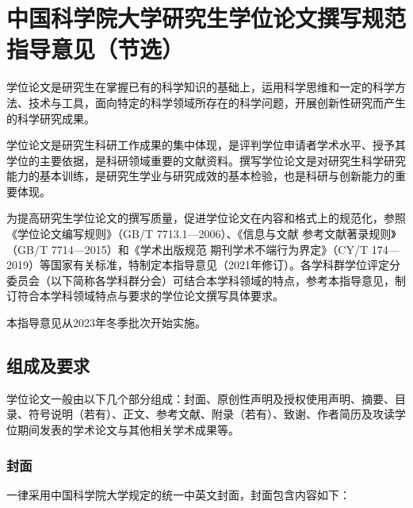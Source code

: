 
\chapter{中国科学院大学研究生学位论文撰写规范指导意见（节选）}

学位论文是研究生在掌握已有的科学知识的基础上，运用科学思维和一定的科学方法、技术与工具，面向特定的科学领域所存在的科学问题，开展创新性研究而产生的科学研究成果。

学位论文是研究生科研工作成果的集中体现，是评判学位申请者学术水平、授予其学位的主要依据，是科研领域重要的文献资料。撰写学位论文是对研究生科学研究能力的基本训练，是研究生学业与研究成效的基本检验，也是科研与创新能力的重要体现。

为提高研究生学位论文的撰写质量，促进学位论文在内容和格式上的规范化，参照《学位论文编写规则》（GB/T 7713.1—2006）、《信息与文献 参考文献著录规则》（GB/T 7714—2015）和《学术出版规范 期刊学术不端行为界定》（CY/T 174—2019）等国家有关标准，特制定本指导意见（2021年修订）。各学科群学位评定分委员会（以下简称各学科群分会）可结合本学科领域的特点，参考本指导意见，制订符合本学科领域特点与要求的学位论文撰写具体要求。

本指导意见从2023年冬季批次开始实施。

\section{组成及要求}
学位论文一般由以下几个部分组成：封面、原创性声明及授权使用声明、摘要、目录、符号说明（若有）、正文、参考文献、附录（若有）、致谢、作者简历及攻读学位期间发表的学术论文与其他相关学术成果等。
\subsection{封面}
一律采用中国科学院大学规定的统一中英文封面，封面包含内容如下：

